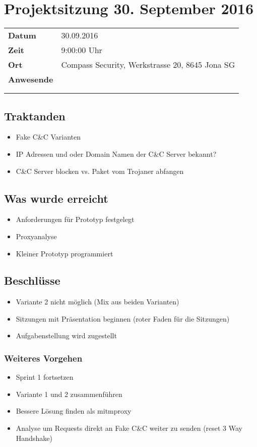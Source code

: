 \documentclass[class=scrbook,crop=false]{standalone}
\begin{document}
	\section{Projektsitzung 30. September 2016}

	\begin{tabular}{ll}
		\textbf{Datum} & 30.09.2016 \\
		\textbf{Zeit} & 9:00\textendash10:00 Uhr \\
		\textbf{Ort} & Compass Security, Werkstrasse 20, 8645 Jona SG \\
		\textbf{Anwesende} & \ibuf \\ & \fbif \\ & \sadf
	\end{tabular}

	\subsection*{Traktanden}
	\begin{itemize}
		\item Fake C\&C Varianten
		\item IP Adressen und oder Domain Namen der C\&C Server bekannt?
		\item C\&C Server blocken vs. Paket vom Trojaner abfangen
	\end{itemize}

	\subsection*{Was wurde erreicht}
	\begin{itemize}
		\item Anforderungen für Prototyp festgelegt
		\item Proxyanalyse
		\item Kleiner Prototyp programmiert
	\end{itemize}

	\subsection*{Beschlüsse}
	\begin{itemize}
		\item Variante 2 nicht möglich (Mix aus beiden Varianten)
    \item Sitzungen mit Präsentation beginnen (roter Faden für die Sitzungen)
		\item Aufgabenstellung wird zugestellt
	\end{itemize}

	\subsubsection*{Weiteres Vorgehen}
	\begin{itemize}
    	  \item Sprint 1 fortsetzen
				\item Variante 1 und 2 zusammenführen
				\item Bessere Lösung finden als mitmproxy
				\item Analyse um Requests direkt an Fake C\&C weiter zu senden (reset 3 Way Handshake)
	\end{itemize}
\end{document}
